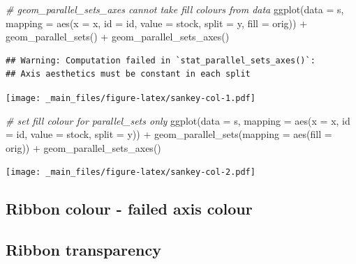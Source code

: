\documentclass[
]{book}
\newenvironment{Shaded}{\begin{snugshade}}{\end{snugshade}}
\newcommand{\AttributeTok}[1]{\textcolor[rgb]{0.77,0.63,0.00}{#1}}
\newcommand{\CommentTok}[1]{\textcolor[rgb]{0.56,0.35,0.01}{\textit{#1}}}
\newcommand{\FunctionTok}[1]{\textcolor[rgb]{0.00,0.00,0.00}{#1}}
\newcommand{\NormalTok}[1]{#1}
\newcommand{\SpecialCharTok}[1]{\textcolor[rgb]{0.00,0.00,0.00}{#1}}
\begin{document}
\begin{Shaded}
\begin{Highlighting}[]
\CommentTok{\# geom\_parallel\_sets\_axes cannot take fill colours from data}
\FunctionTok{ggplot}\NormalTok{(}\AttributeTok{data =}\NormalTok{ s, }\AttributeTok{mapping =} \FunctionTok{aes}\NormalTok{(}\AttributeTok{x =}\NormalTok{ x, }\AttributeTok{id =}\NormalTok{ id, }\AttributeTok{value =}\NormalTok{ stock, }\AttributeTok{split =}\NormalTok{ y, }\AttributeTok{fill =}\NormalTok{ orig)) }\SpecialCharTok{+}
  \FunctionTok{geom\_parallel\_sets}\NormalTok{() }\SpecialCharTok{+}
  \FunctionTok{geom\_parallel\_sets\_axes}\NormalTok{()}
\end{Highlighting}
\end{Shaded}

\begin{verbatim}
## Warning: Computation failed in `stat_parallel_sets_axes()`:
## Axis aesthetics must be constant in each split
\end{verbatim}

\texttt{[image: \_main\_files/figure-latex/sankey-col-1.pdf]}

\begin{Shaded}
\begin{Highlighting}[]
\CommentTok{\# set fill colour for parallel\_sets only}
\FunctionTok{ggplot}\NormalTok{(}\AttributeTok{data =}\NormalTok{ s, }\AttributeTok{mapping =} \FunctionTok{aes}\NormalTok{(}\AttributeTok{x =}\NormalTok{ x, }\AttributeTok{id =}\NormalTok{ id, }\AttributeTok{value =}\NormalTok{ stock, }\AttributeTok{split =}\NormalTok{ y)) }\SpecialCharTok{+}
  \FunctionTok{geom\_parallel\_sets}\NormalTok{(}\AttributeTok{mapping =} \FunctionTok{aes}\NormalTok{(}\AttributeTok{fill =}\NormalTok{ orig)) }\SpecialCharTok{+}
  \FunctionTok{geom\_parallel\_sets\_axes}\NormalTok{()}
\end{Highlighting}
\end{Shaded}

\texttt{[image: \_main\_files/figure-latex/sankey-col-2.pdf]}

\hypertarget{ribbon-colour---failed-axis-colour}{%
\subsection{Ribbon colour - failed axis colour}\label{ribbon-colour---failed-axis-colour}}

\hypertarget{ribbon-transparency}{%
\subsection{Ribbon transparency}\label{ribbon-transparency}}
\end{document}
